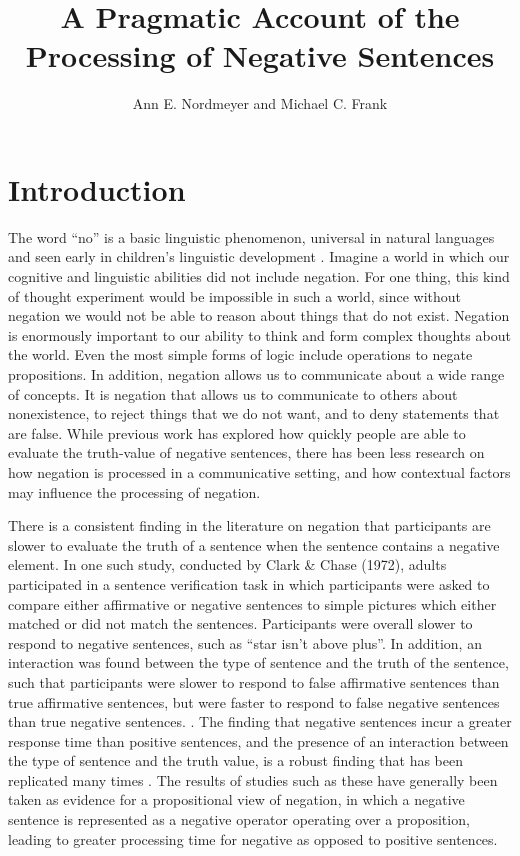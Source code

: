 \documentclass[man]{apa2}
\title{A Pragmatic Account of the Processing of Negative Sentences}
\author{Ann E. Nordmeyer and Michael C. Frank}
\begin{document}
\maketitle


\section{Introduction}
The word ``no'' is a basic linguistic phenomenon, universal in natural languages \cite{dahl2010} and seen early in children's linguistic development \cite{bloom1970, bloom1993, pea1980}.  Imagine a world in which our cognitive and linguistic abilities did not include negation.  For one thing, this kind of thought experiment would be impossible in such a world, since without negation we would not be able to reason about things that do not exist.  Negation is enormously important to our ability to think and form complex thoughts about the world.  Even the most simple forms of logic include operations to negate propositions.  In addition, negation allows us to communicate about a wide range of concepts.  It is negation that allows us to communicate to others about nonexistence, to reject things that we do not want, and to deny statements that are false.  While previous work has explored how quickly people are able to evaluate the truth-value of negative sentences, there has been less research on how negation is processed in a communicative setting, and how contextual factors may influence the processing of negation.  

There is a consistent finding in the literature on negation that participants are slower to evaluate the truth of a sentence when the sentence contains a negative element.  In one such study, conducted by Clark \& Chase (1972), adults participated in a sentence verification task in which participants were asked to compare either affirmative or negative sentences to simple pictures which either matched or did not match the sentences.  Participants were overall slower to respond to negative sentences, such as ``star isn't above plus''.  In addition, an interaction was found between the type of sentence and the truth of the sentence, such that participants were slower to respond to false affirmative sentences than true affirmative sentences, but were faster to respond to false negative sentences than true negative sentences.  \cite{hclark1972}.  The finding that negative sentences incur a greater response time than positive sentences, and the presence of an interaction between the type of sentence and the truth value, is a robust finding that has been replicated many times  \cite{carpenter1975, just1971, just1976}.  The results of studies such as these have generally been taken as evidence for a propositional view of negation, in which a negative sentence is represented as a negative operator operating over a proposition, leading to greater processing time for negative as opposed to positive sentences.  
\end{document}
